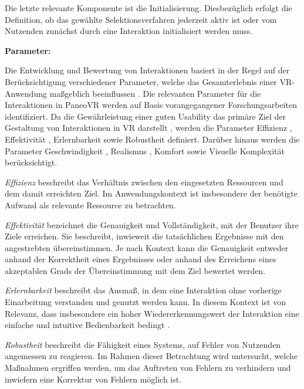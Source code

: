 Die letzte relevante Komponente ist die Initialisierung. Diesbezüglich erfolgt die Definition, ob das gewählte Selektionsverfahren jederzeit aktiv ist oder vom Nutzenden zunächst durch eine Interaktion initialisiert werden muss. 

{\normalfont \bfseries Parameter:} 

Die Entwicklung und Bewertung von Interaktionen basiert in der Regel auf der Berücksichtigung verschiedener Parameter, welche das Gesamterlebnis einer VR-Anwendung maßgeblich beeinflussen \citep{10.1145/3441852.3471230}. Die relevanten Parameter für die Interaktionen in PaneoVR werden auf Basis vorangegangener Forschungsarbeiten identifiziert. Da die Gewährleistung einer guten Usability das primäre Ziel der Gestaltung von Interaktionen in VR darstellt \citep{dorner_virtual_2019}, werden die Parameter Effizienz \citep{noauthor_din_nodate-1}, Effektivität \citep{noauthor_din_nodate-1}, Erlernbarkeit \citep{noauthor_din_nodate} sowie Robustheit \citep{noauthor_din_nodate} definiert. Darüber hinaus werden die Parameter Geschwindigkeit \citep{COOK2015117}, Realismus \citep{jerald_vr_2016}, Komfort \citep{jerald_vr_2016} sowie Visuelle Komplexität \citep{steriadis_designing_2003} berücksichtigt. 

\textit{Effizienz} beschreibt das Verhältnis zwischen den eingesetzten Ressourcen und dem damit erreichten Ziel. Im Anwendungskontext ist  insbesondere der benötigte Aufwand als relevante Ressource zu betrachten.

\textit{Effektivität} bezeichnet die Genauigkeit und Vollständigkeit, mit der Benutzer ihre Ziele erreichen. Sie beschreibt, inwieweit die tatsächlichen Ergebnisse mit den angestrebten übereinstimmen. Je nach Kontext kann die Genauigkeit entweder anhand der Korrektheit eines Ergebnisses oder anhand des Erreichens eines akzeptablen Grads der Übereinstimmung mit dem Ziel bewertet werden.

\textit{Erlernbarkeit} beschreibt das Ausmaß, in dem eine Interaktion ohne vorherige Einarbeitung verstanden und genutzt werden kann. In diesem Kontext ist von Relevanz, dass insbesondere ein hoher Wiedererkennungswert der Interaktion eine einfache und intuitive Bedienbarkeit bedingt \citep{jerald_vr_2016}.

\textit{Robustheit} beschreibt die Fähigkeit eines Systems, auf Fehler von Nutzenden angemessen zu reagieren. Im Rahmen dieser Betrachtung wird untersucht, welche Maßnahmen ergriffen werden, um das Auftreten von Fehlern zu verhindern und inwiefern eine Korrektur von Fehlern möglich ist.

